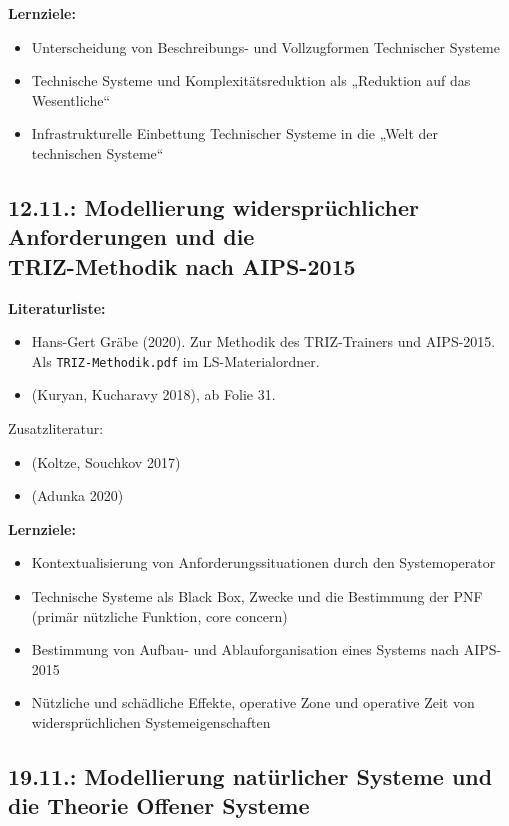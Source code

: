 \documentclass[11pt,a4paper]{article}
\begin{document}
\textbf{Lernziele:}
\begin{itemize}[noitemsep]
\item Unterscheidung von Beschreibungs- und Vollzugformen Technischer Systeme
\item Technische Systeme und Komplexitätsreduktion als „Reduktion auf das
  Wesentliche“
\item Infrastrukturelle Einbettung Technischer Systeme in die „Welt der
  technischen Systeme“
\end{itemize}

\subsection{12.11.: Modellierung widersprüchlicher Anforderungen und die\\
  TRIZ-Methodik nach AIPS-2015}

\textbf{Literaturliste:}
\begin{itemize}[noitemsep]
\item Hans-Gert Gräbe (2020). Zur Methodik des TRIZ-Trainers und AIPS-2015.\\ 
  Als \texttt{TRIZ-Methodik.pdf} im LS-Materialordner.
\item (Kuryan, Kucharavy 2018), ab Folie 31.
\end{itemize}
Zusatzliteratur:
\begin{itemize}[noitemsep]
\item (Koltze, Souchkov 2017)
\item (Adunka 2020)
\end{itemize}

\textbf{Lernziele:}
\begin{itemize}[noitemsep]
\item Kontextualisierung von Anforderungssituationen durch den Systemoperator 
\item Technische Systeme als Black Box, Zwecke und die Bestimmung der PNF
  (primär nützliche Funktion, core concern)
\item Bestimmung von Aufbau- und Ablauforganisation eines Systems nach
  AIPS-2015 
\item Nützliche und schädliche Effekte, operative Zone und operative Zeit von
  widersprüch\-lichen Systemeigenschaften
\end{itemize}
\newpage
\subsection{19.11.: Modellierung natürlicher Systeme und die Theorie Offener
  Systeme}
\end{document}
